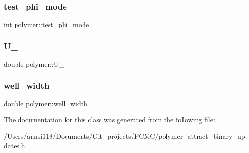 \subsubsection{\texorpdfstring{test\+\_\+phi\+\_\+mode}{test\_phi\_mode}}
{\footnotesize\ttfamily int polymer\+::test\+\_\+phi\+\_\+mode}

\hypertarget{classpolymer_af704fc330a4a90c5fe436ed053cb26ef}{}\label{classpolymer_af704fc330a4a90c5fe436ed053cb26ef} 
\subsubsection{\texorpdfstring{U\+\_}{U\_0}}
{\footnotesize\ttfamily double polymer\+::\+U\+\_}

\hypertarget{classpolymer_a6dd44a7eff4fc1ae2e2729a115278a5d}{}\label{classpolymer_a6dd44a7eff4fc1ae2e2729a115278a5d} 
\subsubsection{\texorpdfstring{well\+\_\+width}{well\_width}}
{\footnotesize\ttfamily double polymer\+::well\+\_\+width}



The documentation for this class was generated from the following file\+:\begin{DoxyCompactItemize}
\item 
/\+Users/annsi118/\+Documents/\+Git\+\_\+projects/\+P\+C\+M\+C/\hyperlink{polymer__attract__binary__updates_8h}{polymer\+\_\+attract\+\_\+binary\+\_\+updates.\+h}\end{DoxyCompactItemize}
